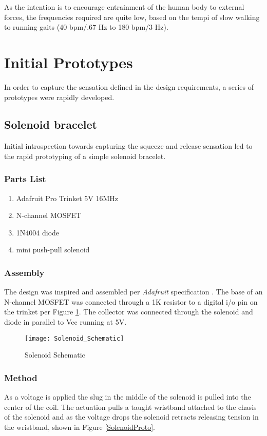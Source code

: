 As the intention is to encourage entrainment of the human body to external forces, the frequencies
required are quite low, based on the tempi of slow walking to running gaits
(40 bpm/.67 Hz to 180 bpm/3 Hz).

\cite{Neely}

\section{Initial Prototypes}
In order to capture the sensation defined in the design requirements, a series of prototypes were rapidly developed.

\subsection{Solenoid bracelet}
Initial introspection towards capturing the squeeze and release sensation led to the rapid prototyping of a simple solenoid bracelet. 
\subsubsection{Parts List}
\begin{enumerate}
    \item Adafruit Pro Trinket 5V 16MHz
    \item N-channel MOSFET
    \item 1N4004 diode
    \item mini push-pull solenoid
\end{enumerate}
\subsubsection{Assembly}
The design was inspired and assembled per \textit{Adafruit} specification \cite{Solenoid}. 
The base of an N-channel MOSFET was connected through a 1K resistor to a digital i/o pin on the trinket per Figure \ref{SolenoidSchematic}. The collector was connected through the solenoid and diode in parallel to Vcc running at 5V.
\begin{figure}[H]
    \texttt{[image: Solenoid\_Schematic]}
    \caption{Solenoid Schematic}
    \label{SolenoidSchematic}
\end{figure}
\subsubsection{Method}
    As a voltage is applied the slug in the middle of the solenoid is pulled into the center of the coil. The actuation pulls a taught wristband attached to the chasis of the solenoid and as the voltage drops the solenoid retracts releasing tension in the wristband, shown in Figure \ref{SolenoidProto}.
    
